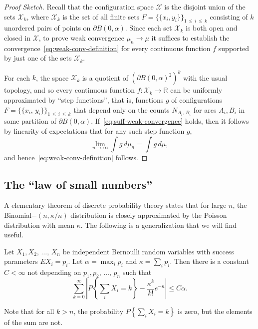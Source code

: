 \documentclass[10pt]{amsart}
\theoremstyle{definition}\newtheorem{defi}[theo]{Definition}\newtheorem{rema}[theo]{Remark}\newtheorem{exam}[theo]{Example}\newtheorem{exem}[theo]{Example}\newtheorem{nota}[theo]{Notation}
\newcommand{\zz}[1]{\mathbb #1}
\begin{document}
\begin{proof}
[Proof Sketch] Recall that the configuration space $\mathcal{X}$ is the disjoint union of the sets $\mathcal{X}_{k}$, where $\mathcal{X}_{k}$ is the set of all finite sets $F=\{\{x_{i},y_{i} \} \}_{1\,\leq\,i\,\leq\, k}$ consisting of $k$ unordered pairs of points on $\partial B (0,\alpha)$. Since each set $\mathcal{X}_{k}$ is both open and closed in $\mathcal{X}$, to prove weak convergence $\mu_{n}\rightarrow \mu$ it suffices to establish the convergence~\eqref{eq:weak-conv-definition} for every continuous function $f$ supported by just one of the sets $\mathcal{X}_{k}$.

For each $k$, the space $\mathcal{X}_{k}$ is a quotient of $(\partial B (0,\alpha)^{2})^{k}$ with the usual topology, and so every continuous function $f:\mathcal{X}_{k}\rightarrow \zz{R}$ can be uniformly approximated by ``step functions'', that is, functions $g$ of configurations $F=\{\{x_{i},\,y_{i} \} \}_{1\,\leq\,i\,\leq\,k}$ that depend only on the counts $N_{A_{i},\,B_{i}}$ for arcs $A_{i},B_{i}$ in some partition of $\partial B (0,\alpha)$. If~\eqref{eq:suff-weak-convergence} holds, then it follows by linearity of expectations that for any such step function $g$,
\[
\lim_{n \rightarrow \infty} \int g\,d\mu_{n}=\int g\,d\mu,
\]
and hence~\eqref{eq:weak-conv-definition} follows.
\end{proof}



\subsection{The ``law of small numbers''}\label{ssec:lsn}
A elementary theorem of discrete probability theory states that for large $n$, the Binomial$- (n,\kappa /n)$ distribution is closely approximated by the Poisson distribution with mean $\kappa$. The following is a generalization that we will find useful.

\begin{prop}\label{proposition:lsn}
Let $X_{1},X_{2},\,\dotsc,\,X_{n}$ be independent Bernoulli random variables with success parameters $EX_{i}=p_{i}$. Let $\alpha =\max_{i}p_{i}$ and $\kappa =\sum_{i}p_{i}$. Then there is a constant $C<\infty$ not depending on $p_{1},p_{2},\,\dotsc,\,p_{n}$ such that
\[
\sum_{k=0}^{\infty} \left\lvert P\left\{\sum_{i}X_{i}=k
\right\}-\frac{\kappa^{k}}{k!}e^{-\kappa}\right\rvert \leq C\alpha.
\]
\end{prop}

Note that for all $k > n$, the probability $P\left\{\sum_{i}X_{i}=k \right\}$ is zero, but the elements of the sum are not.
\end{document}

